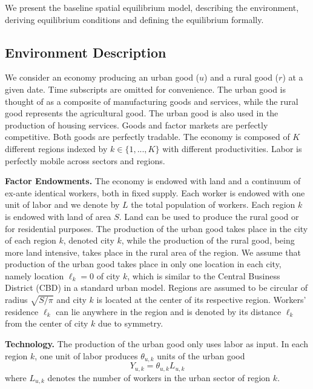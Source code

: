 \documentclass[20250130-paper.tex]{subfiles}
\begin{document}
We present the baseline spatial equilibrium model, describing the environment, deriving equilibrium conditions and defining the equilibrium formally. %

\subsection{Environment Description}
\label{subsec:environment}
We consider an economy producing an urban good ($u$) and a rural good ($r$) at a given date. Time subscripts are omitted for convenience. The urban good is thought of as a composite of manufacturing goods and services, while the rural good represents the agricultural good. The urban good is also used in the production of housing services. Goods and factor markets are perfectly competitive. Both goods are perfectly tradable. The economy is composed of $K$ different regions indexed by $k \in \{1,..., K\}$ with different productivities. Labor is perfectly mobile across sectors and regions. 

\textbf{Factor Endowments.} The economy is endowed with land and a continuum of ex-ante identical workers, both in fixed supply. Each worker is endowed with one unit of labor and we denote by $L$ the total population of workers. Each region $k$ is endowed with land of area $S$. Land can be used to produce the rural good or for residential purposes. The production of the urban good takes place in the city of each region $k$, denoted city $k$, while the production of the rural good, being more land intensive, takes place in the rural area of the region. We assume that production of the urban good takes place in only one location in each city, namely location $\ell_k=0$ of city $k$, which is similar to the Central Business District (CBD) in a standard urban model. Regions are assumed to be circular of radius $\sqrt{S/\pi}$ and city $k$ is located at the center of its respective region. Workers' residence $\ell_k$ can lie anywhere in the region and is denoted by its distance $\ell_k$ from the center of city $k$ due to symmetry. 

\textbf{Technology.} The production of the urban good only uses labor as input. In each region $k$, one unit of labor produces $\theta_{u,k}$ units of the urban good
\begin{equation*}
Y_{u,k} =\theta_{u,k}L_{u,k}
\end{equation*}
where $L_{u,k}$ denotes the number of workers in the urban sector of region $k$.
\end{document}
